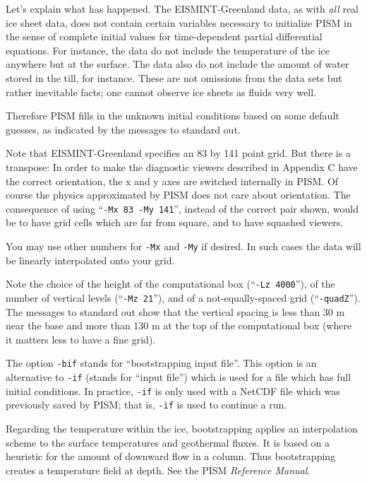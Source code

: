 \documentclass[11pt,final]{amsart}
\begin{document}
\noindent Let's explain what has happened.  The EISMINT-Greenland data, as with \emph{all} real ice sheet data, does not contain certain variables necessary to initialize PISM in the sense of complete initial values for time-dependent partial differential equations.  For instance, the data do not include the temperature of the ice anywhere but at the surface.  The data also do not include the amount of water stored in the till, for instance.  These are not omissions from the data sets but rather inevitable facts; one cannot observe ice sheets as fluids very well.

Therefore PISM fills in the unknown initial conditions based on some default guesses, as indicated by the messages to standard out.

Note that EISMINT-Greenland specifies an 83 by 141 point grid.  But there is a transpose: In order to make the diagnostic viewers described in Appendix C have the correct orientation, the x and y axes are switched internally in PISM.  Of course the physics approximated by PISM does not care about orientation.  The consequence of using ``\verb|-Mx 83 -My 141|'', instead of the correct pair shown, would be to have grid cells which are far from square, and to have squashed viewers.

You may use other numbers for \verb|-Mx| and \verb|-My| if desired.  In such cases the data will be linearly interpolated onto your grid.

Note the choice of the height of the computational box (``\verb|-Lz 4000|''), of the number of vertical levels (``\verb|-Mz 21|''), and of a not-equally-spaced grid (``\verb|-quadZ|'').  The messages to standard out show that the vertical spacing is less than 30 m near the base and more than 130 m at the top of the computational box (where it matters less to have a fine grid).

The option \verb|-bif| stands for ``bootstrapping input file''.  This option is an alternative to \verb|-if| (stands for ``input file'') which is used for a file which has full initial conditions.  In practice, \verb|-if| is only used with a NetCDF file which was previously saved by PISM; that is, \verb|-if| is used to continue a run.

Regarding the temperature within the ice, bootstrapping applies an interpolation scheme to the surface temperatures and geothermal fluxes.  It is based on a heuristic for the amount of downward flow in a column.  Thus bootstrapping creates a temperature field at depth.  See the PISM \emph{Reference Manual}.
\end{document}
